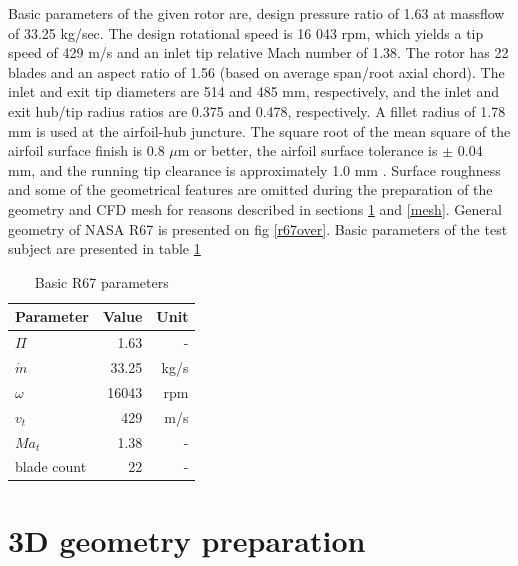 Basic parameters of the given rotor are, design pressure ratio of 1.63 at massflow of 33.25 kg/sec. The design rotational speed is 16 043 rpm, which yields a tip speed of 429 m/s and an inlet tip relative Mach number of 1.38. The rotor has 22 blades and an aspect ratio of 1.56 (based on average span/root axial chord). The inlet and exit tip diameters are 514 and 485 mm, respectively, and the inlet and exit hub/tip radius ratios are 0.375 and 0.478, respectively. A fillet radius of 1.78 mm is used at the airfoil-hub juncture. The square root of the mean square of the airfoil surface finish is 0.8 $\mu${}m or better, the airfoil surface tolerance is $\pm$ 0.04 mm, and the running tip clearance is approximately 1.0 mm \citep{r67laser}. Surface roughness and some of the geometrical features are omitted during the preparation of the geometry and CFD mesh for reasons described in sections \ref{3dgeom} and \ref{mesh}. General geometry of NASA R67 is presented on fig \ref{r67over}. Basic parameters of the test subject are presented in table \ref{tab:data}

\begin{table}[ht!]
\centering
\caption{Basic R67 parameters} \label{tab:data}
\begin{tabular}{@{}lrr@{}}
\toprule
Parameter   & Value & Unit \\ \midrule
$\Pi$          & 1.63  & -    \\
$\dot{m}$      & 33.25 & kg/s \\
$\omega$       & 16043 & rpm  \\
$v_t$          & 429   & m/s  \\
$Ma_t$         & 1.38  & -    \\
blade count    & 22    & -    \\ \bottomrule
\end{tabular}
\end{table}

\section{3D geometry preparation} \label{3dgeom}


